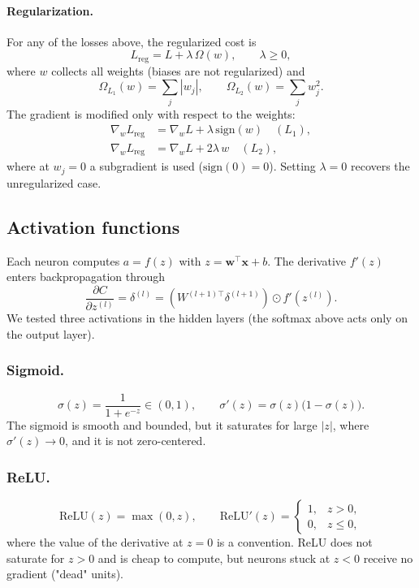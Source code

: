 \documentclass[amssymb,twocolumn,aps]{revtex4}
\begin{document}
\paragraph{Regularization.}
For any of the losses above, the regularized cost is
\begin{equation}
L_{\mathrm{reg}} = L + \lambda\,\Omega(w),\qquad \lambda\ge 0,
\end{equation}
where $w$ collects all weights (biases are not regularized) and
\begin{equation}
\Omega_{L_1}(w)=\sum_j|w_j|,\qquad \Omega_{L_2}(w)=\sum_j w_j^2 .
\label{eq:penalty}
\end{equation}
The gradient is modified only with respect to the weights:
\begin{align*}
\nabla_w L_{\mathrm{reg}} &= \nabla_w L + \lambda\,\mathrm{sign}(w)\quad(L_1),
\\
\nabla_w L_{\mathrm{reg}} &= \nabla_w L + 2\lambda\, w\quad(L_2),
\end{align*}
where at $w_j=0$ a subgradient is used ($\mathrm{sign}(0)=0$). Setting $\lambda=0$ recovers the unregularized case. 

\subsection{Activation functions}
Each neuron computes $a=f(z)$ with $z=\mathbf{w}^\top\mathbf{x}+b$. The derivative $f'(z)$ enters backpropagation through
\begin{equation}
\frac{\partial C}{\partial z^{(l)}}=\delta^{(l)}=\left(W^{(l+1)\top}\delta^{(l+1)}\right)\odot f'\!\left(z^{(l)}\right).
\end{equation}
We tested three activations in the hidden layers (the softmax above acts only on the output layer).

\subsubsection{Sigmoid.}
\begin{equation}
\sigma(z)=\frac{1}{1+e^{-z}}\in(0,1),\qquad \sigma'(z)=\sigma(z)\bigl(1-\sigma(z)\bigr) .
\end{equation}
The sigmoid is smooth and bounded, but it saturates for large $|z|$, where $\sigma'(z) \to 0$, and it is not zero-centered.

\subsubsection{ReLU.}
\begin{equation}
\mathrm{ReLU}(z)=\max(0,z),\qquad
\mathrm{ReLU}'(z)=\begin{cases}1,&z>0,\\0,&z\le 0,\end{cases}
\end{equation}
where the value of the derivative at $z=0$ is a convention. ReLU does not saturate for $z>0$ and is cheap to compute, but neurons stuck at $z<0$ receive no gradient ("dead" units).
\end{document}
